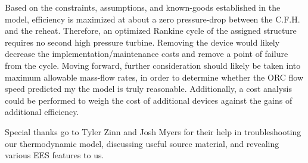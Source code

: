 \documentclass[10pt,cleanfoot]{asme2ej}
\begin{document}
Based on the constraints, assumptions, and known-goods established in the model, efficiency is maximized at about a zero pressure-drop between the C.F.H. and the reheat. Therefore, an optimized Rankine cycle of the assigned structure requires no second high pressure turbine. Removing the device would likely decrease the implementation/maintenance costs and remove a point of failure from the cycle. Moving forward, further consideration should likely be taken into maximum allowable mass-flow rates, in order to determine whether the ORC flow speed predicted my the model is truly reasonable. Additionally, a cost analysis could be performed to weigh the cost of additional devices against the gains of additional efficiency.

\begin{acknowledgment}
Special thanks go to Tyler Zinn and Josh Myers for their help in troubleshooting our thermodynamic model, discussing useful source material, and revealing various EES features to us.
\end{acknowledgment}
\end{document}

